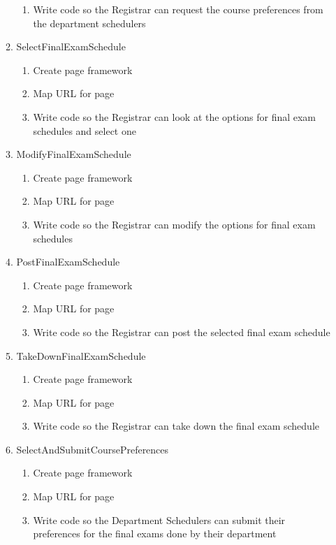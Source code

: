 \documentclass[11pt]{article}
\begin{document}
\begin{enumerate}
\begin{enumerate}
\begin{enumerate}
\item Write code so the Registrar can request the course preferences from the department
schedulers
\end{enumerate}
\item SelectFinalExamSchedule
\begin{enumerate}
\item Create page framework
\item Map URL for page
\item Write code so the Registrar can look at the options for final exam schedules and select
one
\end{enumerate}
\item ModifyFinalExamSchedule
 \begin{enumerate}
\item Create page framework
\item Map URL for page
\item Write code so the Registrar can modify the options for final exam schedules
\end{enumerate}
\item PostFinalExamSchedule
 \begin{enumerate}
\item Create page framework
\item Map URL for page
\item Write code so the Registrar can post the selected final exam schedule
\end{enumerate}
\item TakeDownFinalExamSchedule
 \begin{enumerate}
\item Create page framework
\item Map URL for page
\item Write code so the Registrar can take down the final exam schedule
\end{enumerate}
\item SelectAndSubmitCoursePreferences
\begin{enumerate}
\item Create page framework
\item Map URL for page
\item Write code so the Department Schedulers can submit their preferences for the final exams
done by their department
\end{enumerate}
\end{enumerate}
\end{enumerate}


\clearpage
\end{document}
